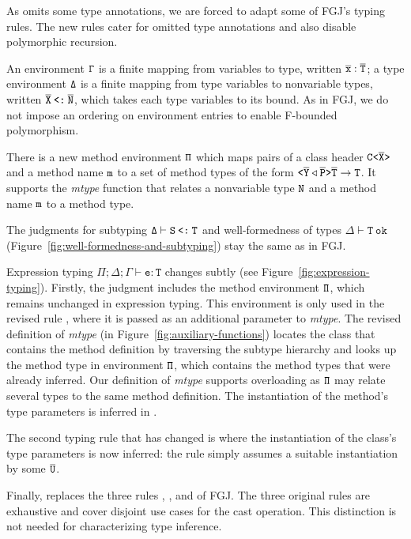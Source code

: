 As \TFGJ omits some type annotations, we are forced to adapt some of 
FGJ's typing rules. The new rules cater for omitted type annotations
and also disable polymorphic recursion.

An environment ${\tt \Gamma}$ is a finite mapping from variables to type,
written $\overline{\tt x}:\overline{\tt T}$; a type environment ${\tt \Delta}$ is a finite mapping
from type variables to nonvariable types, written $\overline{\tt X}\mathbin{\texttt{<:}}\overline{\tt N}$, which takes each type variables to its bound. As in FGJ, we do not
impose an ordering on environment entries to enable F-bounded
polymorphism.

There is a new method environment ${\tt \Pi}$ which maps pairs of a class header
$\mathtt{C \texttt{<} \overline{\tt X} \texttt{>} }$ and a method name ${\tt m}$ to a set of method
types of the form $\mathtt{ \texttt{<} \overline{\tt Y} \triangleleft  \overline{\tt P} \texttt{>} } \overline{\tt T} \to {\tt T}$. 
It supports the \textit{mtype} function that relates a nonvariable type
${\tt N}$ and a method name ${\tt m}$ to a method type.

The judgments for subtyping $\mathtt{\Delta \vdash S \mathbin{\texttt{<:}} T}$ and
well-formedness of types $\mathtt{\Delta \vdash T\ \mathtt{ok}}$
(Figure~\ref{fig:well-formedness-and-subtyping}) stay the same as in
FGJ.

Expression typing $\mathtt{\Pi; \Delta; \Gamma \vdash e
  : T}$ changes subtly (see
Figure~\ref{fig:expression-typing}). Firstly, the judgment includes
the method 
environment ${\tt \Pi}$, which remains unchanged in expression
typing. This environment is only used in the revised rule
, where it is passed as an additional parameter to
\textit{mtype}. The revised definition of \textit{mtype} (in
Figure~\ref{fig:auxiliary-functions}) locates the class that contains
the method definition by traversing the subtype hierarchy and looks up the
method type in environment ${\tt \Pi}$, which contains the method types
that were already inferred. Our definition of \textit{mtype} supports
overloading as ${\tt \Pi}$ may relate several types to the same method
definition. The instantiation of the method's type parameters is
inferred in \TFGJ.

The second typing rule that has changed is  where the
instantiation of the class's type parameters is now inferred: the rule
simply assumes a suitable instantiation by some $\overline{\tt U}$.

Finally,  replaces the three rules
, , and 
of FGJ. The three original rules are exhaustive and cover disjoint use
cases for the cast operation. This distinction is not needed for
characterizing type inference. 


